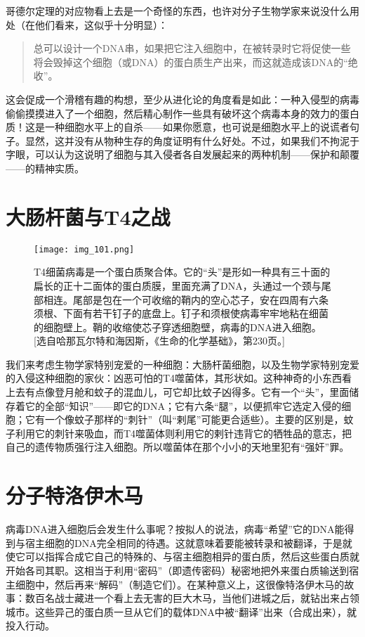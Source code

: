 哥德尔定理的对应物看上去是一个奇怪的东西，也许对分子生物学家来说没什么用处（在他们看来，这似乎十分明显）：

\begin{quote}
总可以设计一个DNA串，如果把它注入细胞中，在被转录时它将促使一些将会毁掉这个细胞（或DNA）的蛋白质生产出来，而这就造成该DNA的“绝收”。
\end{quote}

这会促成一个滑稽有趣的构想，至少从进化论的角度看是如此：一种入侵型的病毒偷偷摸摸进入了一个细胞，然后精心制作一些具有破坏这个病毒本身的效力的蛋白质！这是一种细胞水平上的自杀——如果你愿意，也可说是细胞水平上的说谎者句子。显然，这并没有从物种生存的角度证明有什么好处。不过，如果我们不拘泥于字眼，可以认为这说明了细胞与其入侵者各自发展起来的两种机制——保护和颠覆——的精神实质。

\section{大肠杆菌与T4之战}

\begin{figure}
\texttt{[image: img\_101.png]}
\caption[T4细菌病毒。]
  {T4细菌病毒是一个蛋白质聚合体。它的“头”是形如一种具有三十面的扁长的正十二面体的蛋白质膜，里面充满了DNA，头通过一个颈与尾部相连。尾部是包在一个可收缩的鞘内的空心芯子，安在四周有六条须根、下面有若干钉子的底盘上。钉子和须根使病毒牢牢地粘在细菌的细胞壁上。鞘的收缩使芯子穿透细胞壁，病毒的DNA进入细胞。[选自哈那瓦尔特和海因斯，《生命的化学基础》，第230页。]}
\end{figure}

我们来考虑生物学家特别宠爱的一种细胞：大肠杆菌细胞，以及生物学家特别宠爱的入侵这种细胞的家伙：凶恶可怕的T4噬菌体，其形状如。这种神奇的小东西看上去有点像登月舱和蚊子的混血儿，可它却比蚊子凶得多。它有一个“头”，里面储存着它的全部“知识”——即它的DNA；它有六条“腿”，以便抓牢它选定入侵的细胞；它有一个像蚊子那样的“刺针”（叫“剌尾”可能更合适些）。主要的区别是，蚊子利用它的刺针来吸血，而T4噬菌体则利用它的剌针违背它的牺牲品的意志，把自己的遗传物质强行注入细胞。所以噬菌体在那个小小的天地里犯有“强奸”罪。

\section{分子特洛伊木马}

病毒DNA进入细胞后会发生什么事呢？按拟人的说法，病毒“希望”它的DNA能得到与宿主细胞的DNA完全相同的待遇。这就意味着要能被转录和被翻译，于是就使它可以指挥合成它自己的特殊的、与宿主细胞相异的蛋白质，然后这些蛋白质就开始各司其职。这相当于利用“密码”（即遗传密码）秘密地把外来蛋白质输送到宿主细胞中，然后再来“解码”（制造它们）。在某种意义上，这很像特洛伊木马的故事：数百名战士藏进一个看上去无害的巨大木马，当他们进城之后，就钻出来占领城市。这些异己的蛋白质一旦从它们的载体DNA中被“翻译”出来（合成出来），就投入行动。

